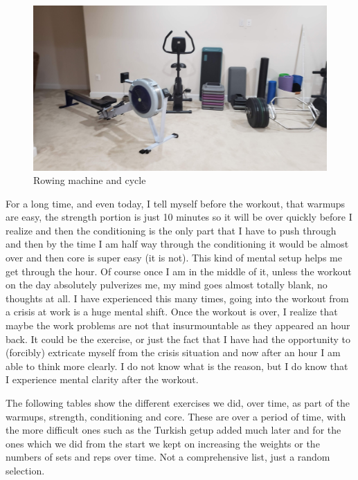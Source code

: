 \documentclass[
  oneside]{book}
\begin{document}
\begin{figure}
\centering
\includegraphics{pictures/gym1.jpg}
\caption{Rowing machine and cycle}
\end{figure}

For a long time, and even today, I tell myself before the workout, that warmups are easy, the strength portion is just 10 minutes so it will be over quickly before I realize and then the conditioning is the only part that I have to push through and then by the time I am half way through the conditioning it would be almost over and then core is super easy (it is not). This kind of mental setup helps me get through the hour. Of course once I am in the middle of it, unless the workout on the day absolutely pulverizes me, my mind goes almost totally blank, no thoughts at all. I have experienced this many times, going into the workout from a crisis at work is a huge mental shift. Once the workout is over, I realize that maybe the work problems are not that insurmountable as they appeared an hour back. It could be the exercise, or just the fact that I have had the opportunity to (forcibly) extricate myself from the crisis situation and now after an hour I am able to think more clearly. I do not know what is the reason, but I do know that I experience mental clarity after the workout.

The following tables show the different exercises we did, over time, as part of the warmups, strength, conditioning and core. These are over a period of time, with the more difficult ones such as the Turkish getup added much later and for the ones which we did from the start we kept on increasing the weights or the numbers of sets and reps over time. Not a comprehensive list, just a random selection.
\end{document}
